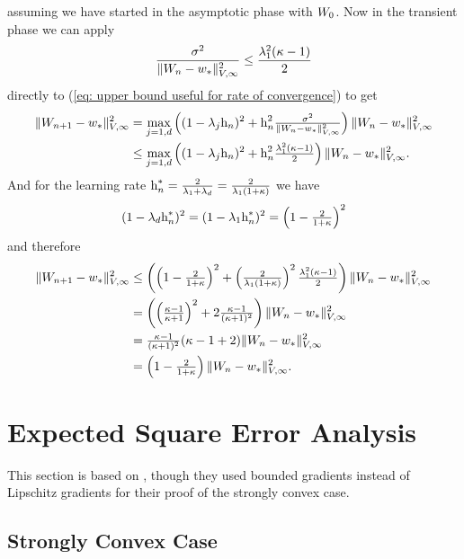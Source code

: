 assuming we have started in the asymptotic phase with \(W_0\). Now in the
transient phase we can apply
\begin{align*}
	\frac{\sigma^2}{
		\|W_n-w_*\|_{V,\infty}^2
	}
	\le \frac{\lambda_1^2(\kappa-1)}{2}
\end{align*}
directly to (\ref{eq: upper bound useful for rate of convergence}) to get
\begin{align*}
	\|W_{n+1}-w_*\|_{V,\infty}^2
	&= \max_{j=1,d}\left((1- \lambda_j\text{h}_n)^2
		+\text{h}_n^2\tfrac{\sigma^2}{\|W_n-w_*\|_{V,\infty}^2}
	\right)\|W_n-w_*\|_{V,\infty}^2\\
	&\le \max_{j=1,d}\left((1- \lambda_j\text{h}_n)^2
		+\text{h}_n^2\tfrac{\lambda_1^2(\kappa-1)}{2}
	\right)\|W_n-w_*\|_{V,\infty}^2.
\end{align*}
And for the learning rate \(\text{h}_n^*=\tfrac{2}{\lambda_1+\lambda_d}=\tfrac{2}{\lambda_1(1+\kappa)}\)
we have
\begin{align*}
	(1-\lambda_d\text{h}_n^*)^2
	= (1-\lambda_1\text{h}_n^*)^2
	= \left(1-\tfrac{2}{1+\kappa}\right)^2
\end{align*}
and therefore
\begin{align*}
	\|W_{n+1}-w_*\|_{V,\infty}^2
	&\le \left(\left(1-\tfrac{2}{1+\kappa}\right)^2
		+\left(\tfrac{2}{\lambda_1(1+\kappa)}\right)^2\tfrac{\lambda_1^2(\kappa-1)}{2}
	\right)\|W_n-w_*\|_{V,\infty}^2\\
	&=\left(
		\left(\tfrac{\kappa-1}{\kappa+1}\right)^2 + 2 \tfrac{\kappa-1}{(\kappa+1)^2}
	\right)\|W_n-w_*\|_{V,\infty}^2\\
	&= \tfrac{\kappa-1}{(\kappa+1)^2}(\kappa-1 + 2)\|W_n-w_*\|_{V,\infty}^2\\
	&= \left(1-\tfrac{2}{1+\kappa}\right)\|W_n - w_*\|_{V,\infty}^2.
\end{align*}

\section{Expected Square Error Analysis}

This section is based on \textcite{nemirovskiRobustStochasticApproximation2009},
though they used bounded gradients instead of Lipschitz gradients for their
proof of the strongly convex case.

\subsection{Strongly Convex Case}


